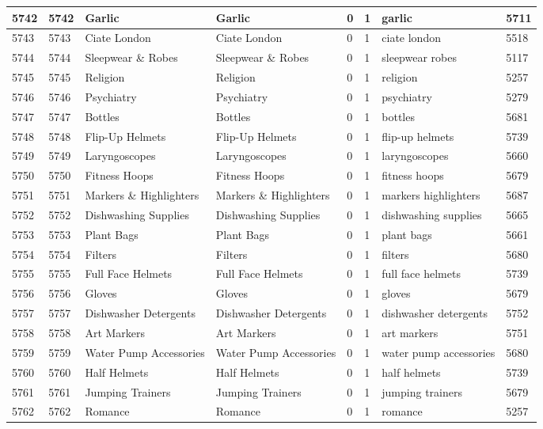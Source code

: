 \begin{longtable}{|l|l|l|l|l|l|l|l|}
5742 & 5742 & Garlic & Garlic & 0 & 1 & garlic & 5711 \\ \hline 
5743 & 5743 & Ciate London & Ciate London & 0 & 1 & ciate london & 5518 \\ \hline 
5744 & 5744 & Sleepwear \& Robes & Sleepwear \& Robes & 0 & 1 & sleepwear robes & 5117 \\ \hline 
5745 & 5745 & Religion & Religion & 0 & 1 & religion & 5257 \\ \hline 
5746 & 5746 & Psychiatry & Psychiatry & 0 & 1 & psychiatry & 5279 \\ \hline 
5747 & 5747 & Bottles & Bottles & 0 & 1 & bottles & 5681 \\ \hline 
5748 & 5748 & Flip-Up Helmets & Flip-Up Helmets & 0 & 1 & flip-up helmets & 5739 \\ \hline 
5749 & 5749 & Laryngoscopes & Laryngoscopes & 0 & 1 & laryngoscopes & 5660 \\ \hline 
5750 & 5750 & Fitness Hoops & Fitness Hoops & 0 & 1 & fitness hoops & 5679 \\ \hline 
5751 & 5751 & Markers \& Highlighters & Markers \& Highlighters & 0 & 1 & markers highlighters & 5687 \\ \hline 
5752 & 5752 & Dishwashing Supplies & Dishwashing Supplies & 0 & 1 & dishwashing supplies & 5665 \\ \hline 
5753 & 5753 & Plant Bags & Plant Bags & 0 & 1 & plant bags & 5661 \\ \hline 
5754 & 5754 & Filters & Filters & 0 & 1 & filters & 5680 \\ \hline 
5755 & 5755 & Full Face Helmets & Full Face Helmets & 0 & 1 & full face helmets & 5739 \\ \hline 
5756 & 5756 & Gloves & Gloves & 0 & 1 & gloves & 5679 \\ \hline 
5757 & 5757 & Dishwasher Detergents & Dishwasher Detergents & 0 & 1 & dishwasher detergents & 5752 \\ \hline 
5758 & 5758 & Art Markers & Art Markers & 0 & 1 & art markers & 5751 \\ \hline 
5759 & 5759 & Water Pump Accessories & Water Pump Accessories & 0 & 1 & water pump accessories & 5680 \\ \hline 
5760 & 5760 & Half Helmets & Half Helmets & 0 & 1 & half helmets & 5739 \\ \hline 
5761 & 5761 & Jumping Trainers & Jumping Trainers & 0 & 1 & jumping trainers & 5679 \\ \hline 
5762 & 5762 & Romance & Romance & 0 & 1 & romance & 5257 \\ \hline 

\end{longtable}
